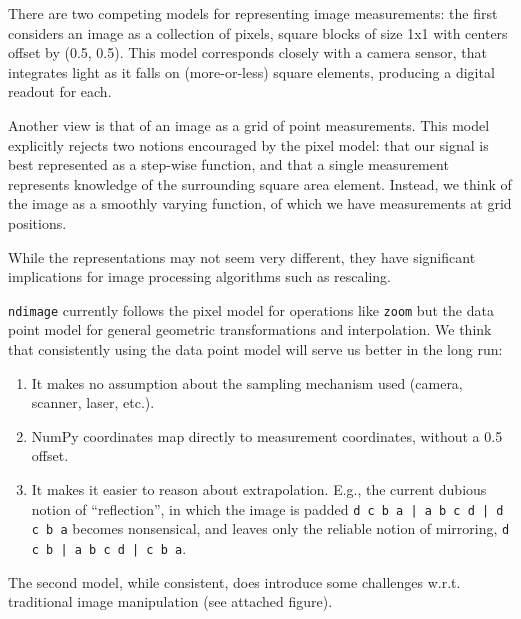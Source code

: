 \documentclass[fleqn,10pt]{wlscirep}
\begin{document}
There are two competing models for representing image measurements:
the first considers an image as a collection of pixels, square blocks
of size 1x1 with centers offset by (0.5, 0.5).  This model corresponds
closely with a camera sensor, that integrates light as it falls on
(more-or-less) square elements, producing a digital readout for each.

Another view is that of an image as a grid of point measurements.
This model explicitly rejects two notions encouraged by the pixel
model: that our signal is best represented as a step-wise function, and
that a single measurement represents knowledge of the surrounding
square area element.  Instead, we think of the image as a smoothly
varying function, of which we have measurements at grid positions.

While the representations may not seem very different, they have
significant implications for image processing algorithms such as
rescaling.

{\tt ndimage} currently follows the pixel model for operations like
{\tt zoom} but the data point model for general geometric
transformations and interpolation.  We think that consistently using
the data point model will serve us better in the long run:

\begin{enumerate}
  \item It makes no assumption about the sampling mechanism used
    (camera, scanner, laser, etc.).
  \item NumPy coordinates map directly to measurement coordinates,
    without a 0.5 offset. 
  \item It makes it easier to reason about extrapolation.  E.g., the current
    dubious notion of ``reflection'', in which the image is padded
    {\tt d c b a | a b c d | d c b a} becomes nonsensical, and leaves
    only the reliable notion of mirroring, {\tt d c b | a b c d | c b a}.
\end{enumerate}

The second model, while consistent, does introduce some challenges
w.r.t. traditional image manipulation (see attached figure).
\end{document}
